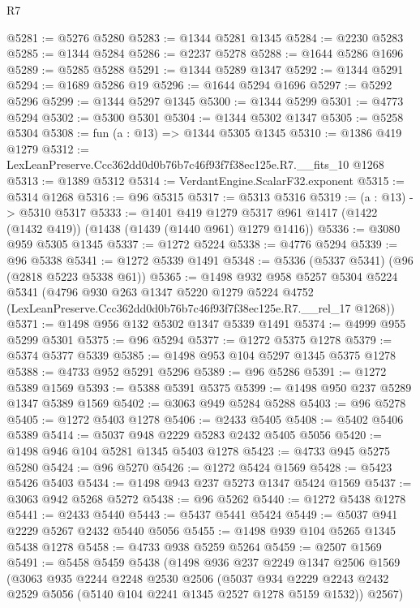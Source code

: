 \begin{lexlean}{R7}
\begin{coremodule}
@5281 := @5276 @5280
@5283 := @1344 @5281 @1345
@5284 := @2230 @5283
@5285 := @1344 @5284
@5286 := @2237 @5278
@5288 := @1644 @5286 @1696
@5289 := @5285 @5288
@5291 := @1344 @5289 @1347
@5292 := @1344 @5291
@5294 := @1689 @5286 @19
@5296 := @1644 @5294 @1696
@5297 := @5292 @5296
@5299 := @1344 @5297 @1345
@5300 := @1344 @5299
@5301 := @4773 @5294
@5302 := @5300 @5301
@5304 := @1344 @5302 @1347
@5305 := @5258 @5304
@5308 := fun (a : @13) => @1344 @5305 @1345
@5310 := @1386 @419 @1279
@5312 := LexLeanPreserve.Ccc362dd0d0b76b7c46f93f7f38ec125e.R7.__fits_10 @1268
@5313 := @1389 @5312
@5314 := VerdantEngine.ScalarF32.exponent
@5315 := @5314 @1268
@5316 := @96 @5315
@5317 := @5313 @5316
@5319 := (a : @13) -> @5310 @5317
@5333 := @1401
    @419
    @1279
    @5317
    @961
    @1417
    (@1422 (@1432 @419))
    (@1438 (@1439 (@1440 @961) @1279 @1416))
@5336 := @3080 @959 @5305 @1345
@5337 := @1272 @5224
@5338 := @4776 @5294
@5339 := @96 @5338
@5341 := @1272 @5339 @1491
@5348 := @5336 (@5337 @5341) (@96 (@2818 @5223 @5338 @61))
@5365 := @1498
    @932
    @958
    @5257
    @5304
    @5224
    @5341
    (@4796
      @930
      @263
      @1347
      @5220
      @1279
      @5224
      @4752
      (LexLeanPreserve.Ccc362dd0d0b76b7c46f93f7f38ec125e.R7.__rel_17 @1268))
@5371 := @1498 @956 @132 @5302 @1347 @5339 @1491
@5374 := @4999 @955 @5299 @5301
@5375 := @96 @5294
@5377 := @1272 @5375 @1278
@5379 := @5374 @5377 @5339
@5385 := @1498 @953 @104 @5297 @1345 @5375 @1278
@5388 := @4733 @952 @5291 @5296
@5389 := @96 @5286
@5391 := @1272 @5389 @1569
@5393 := @5388 @5391 @5375
@5399 := @1498 @950 @237 @5289 @1347 @5389 @1569
@5402 := @3063 @949 @5284 @5288
@5403 := @96 @5278
@5405 := @1272 @5403 @1278
@5406 := @2433 @5405
@5408 := @5402 @5406 @5389
@5414 := @5037 @948 @2229 @5283 @2432 @5405 @5056
@5420 := @1498 @946 @104 @5281 @1345 @5403 @1278
@5423 := @4733 @945 @5275 @5280
@5424 := @96 @5270
@5426 := @1272 @5424 @1569
@5428 := @5423 @5426 @5403
@5434 := @1498 @943 @237 @5273 @1347 @5424 @1569
@5437 := @3063 @942 @5268 @5272
@5438 := @96 @5262
@5440 := @1272 @5438 @1278
@5441 := @2433 @5440
@5443 := @5437 @5441 @5424
@5449 := @5037 @941 @2229 @5267 @2432 @5440 @5056
@5455 := @1498 @939 @104 @5265 @1345 @5438 @1278
@5458 := @4733 @938 @5259 @5264
@5459 := @2507 @1569
@5491 := @5458
    @5459
    @5438
    (@1498
      @936
      @237
      @2249
      @1347
      @2506
      @1569
      (@3063
        @935
        @2244
        @2248
        @2530
        @2506
        (@5037 @934 @2229 @2243 @2432 @2529 @5056 (@5140 @104 @2241 @1345 @2527 @1278 @5159 @1532))
        @2567)

\end{coremodule}
\end{lexlean}
